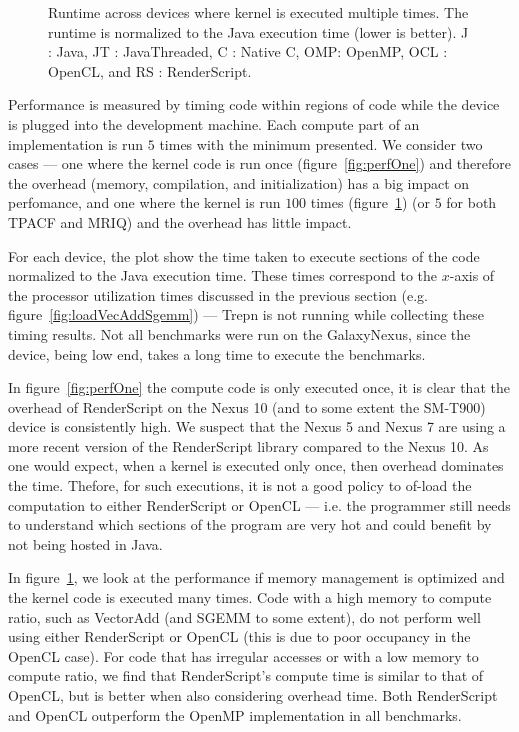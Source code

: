 \begin{figure}
  \caption{Runtime across devices where kernel is executed multiple times. The runtime is normalized to the Java execution time (lower is better). J : Java, JT : JavaThreaded, C : Native C, OMP: OpenMP, OCL : OpenCL, and RS : RenderScript.}
  \label{fig:perfMany}
\end{figure}


Performance is measured by timing code within regions of code while the device is plugged into the development machine.
Each compute part of an implementation is run $5$ times with the minimum
  presented.
We consider two cases --- one where the kernel code is run once (figure~\ref{fig:perfOne}) and therefore
  the overhead (memory, compilation, and initialization) has a big impact on perfomance,
  and one where the kernel is run $100$ times (figure~\ref{fig:perfMany}) (or $5$ for both TPACF and MRIQ)
  and the overhead has little impact.

For each device, the plot show the time taken to execute sections of the code normalized
  to the Java execution time.
These times correspond to the $x$-axis of the processor utilization times discussed
  in the previous section (e.g. figure~\ref{fig:loadVecAddSgemm}) --- Trepn is not
  running while collecting these timing results.
Not all benchmarks were run on the GalaxyNexus, since the device,
  being low end, takes a long time to execute the benchmarks.

In figure~\ref{fig:perfOne} the compute code is only executed once, it is clear that 
  the overhead of RenderScript on the Nexus 10 (and to some extent the SM-T900) device is consistently high.
We suspect that the Nexus 5 and Nexus 7 are using a more recent version of the RenderScript library compared to the Nexus 10.
As one would expect, when a kernel is executed only once, then overhead dominates the time. Thefore, for such executions, it is not a good policy to of-load the computation to either RenderScript or OpenCL ---
  i.e. the programmer still needs to understand which sections of the program are very hot and could benefit by not being hosted 
  in Java.

In figure~\ref{fig:perfMany}, we look at the performance if memory management is optimized and the kernel code is executed 
  many times.
Code with a high memory to compute ratio, such as VectorAdd (and SGEMM to some extent), do not perform well using either
  RenderScript or OpenCL (this is due to poor occupancy in the OpenCL case).
For code that has irregular accesses or with a low memory to compute ratio, we find that RenderScript's compute time is similar
  to that of OpenCL, but is better when also considering overhead time.
Both RenderScript and OpenCL outperform the OpenMP implementation in all benchmarks.

